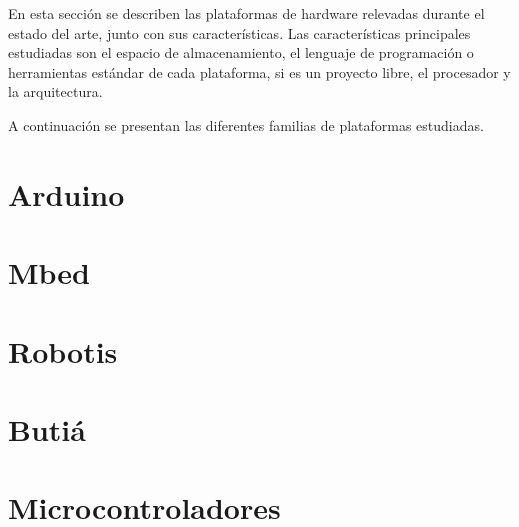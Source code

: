 
  En esta sección se describen las plataformas de hardware relevadas
durante el estado del arte, junto con sus características.
  Las características principales estudiadas 
  son el espacio de almacenamiento,
el lenguaje de programación o herramientas estándar de cada
plataforma, si es un proyecto libre, el procesador y la arquitectura.

  A continuación se presentan las diferentes familias de plataformas
estudiadas.%

\section{Arduino}


\section{Mbed}


\section{Robotis}


%

%

\section{Butiá}


\section{Microcontroladores}

